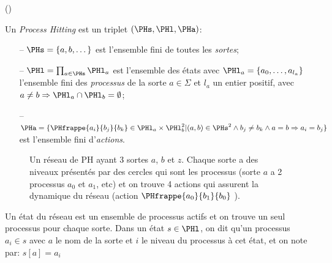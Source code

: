\begin{definition} (\cite{pauleve2011modelisation})

  Un \emph{Process Hitting} est un triplet  $(\PHs,\PHl,\PHa)$:
  \begin{itemize}
    \item[--] $\PHs = \{a,b,\dots\}$ est l'ensemble fini de toutes les \emph{sortes};
    \item[--] $\PHl = \prod_{a\in\PHs} \PHl_a$ est l'ensemble des états avec 
      $\PHl_a = \{a_0,\dots,a_{l_a}\}$
      l'ensemble fini des \emph{processus} de la sorte $a\in\Sigma$
      et $l_a$ un entier positif, avec $a\neq b\Rightarrow \PHl_a \cap \PHl_b = \emptyset$;
    \item[--] $\PHa = \{ \PHfrappe{a_i}{b_j}{b_k} \in \PHl_a \times \PHl_b^2 |
      (a,b) \in \PHs^2 \wedge b_j\neq b_k \wedge a=b\Rightarrow a_i=b_j\}$
     est l'ensemble fini d'\emph{actions}.
  \end{itemize}
\end{definition}

\begin{figure}[ht]
\centering
{}
\caption{\label{fig:expPH} 
Un réseau de PH ayant 3 sortes $a$, $b$ et $z$. Chaque sorte a des niveaux présentés par des cercles qui sont les processus (sorte $a$ a 2 processus $a_0$ et $a_1$, etc) et on trouve 4 actions qui assurent la dynamique du réseau (action $\PHfrappe{a_0}{b_1}{b_0}$ ).
}
\end{figure}

Un état du réseau est un ensemble de processus actifs et on trouve un seul processus pour chaque sorte. Dans un état $s \in \PHl $, on dit qu'un processus $a_i \in s$ avec $a$ le nom de la sorte et $i$ le niveau du processus à cet état, et on note par: $s[a]=a_i$ 

